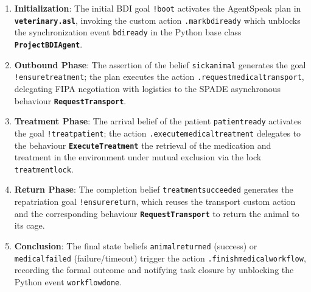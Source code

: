 \documentclass{article}
\renewcommand{\_}{\oldtextunderscore\allowbreak}
\begin{document}
\begin{enumerate}
    \item \textbf{Initialization}: The initial BDI goal \texttt{!boot} activates the AgentSpeak plan in \textbf{\texttt{veterinary.asl}}, invoking the custom action \texttt{.mark\_bdi\_ready} which unblocks the synchronization event \texttt{bdi\_ready} in the Python base class \textbf{\texttt{ProjectBDIAgent}}.
    \item \textbf{Outbound Phase}: The assertion of the belief \texttt{sick\_animal} generates the goal \texttt{!ensure\_treatment}; the plan executes the action \texttt{.request\_medical\_transport}, delegating FIPA negotiation with logistics to the SPADE asynchronous behaviour \textbf{\texttt{RequestTransport}}.
    \item \textbf{Treatment Phase}: The arrival belief of the patient \texttt{patient\_ready} activates the goal \texttt{!treat\_patient}; the action \texttt{.execute\_medical\_treatment} delegates to the behaviour \textbf{\texttt{ExecuteTreatment}} the retrieval of the medication and treatment in the environment under mutual exclusion via the lock \texttt{treatment\_lock}.
    \item \textbf{Return Phase}: The completion belief \texttt{treatment\_succeeded} generates the repatriation goal \texttt{!ensure\_return}, which reuses the transport custom action and the corresponding behaviour \textbf{\texttt{RequestTransport}} to return the animal to its cage.
    \item \textbf{Conclusion}: The final state beliefs \texttt{animal\_returned} (success) or \texttt{medical\_failed} (failure/timeout) trigger the action \texttt{.finish\_medical\_workflow}, recording the formal outcome and notifying task closure by unblocking the Python event \texttt{workflow\_done}.
\end{enumerate}
\end{document}
